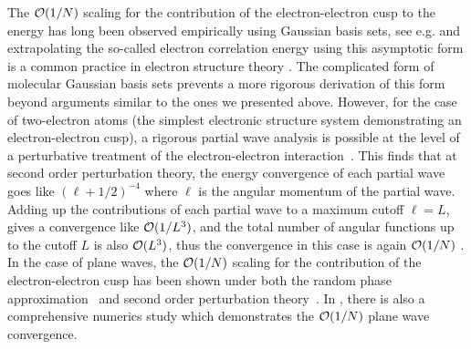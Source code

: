 \documentclass[superscriptaddress,aps,pra,nofootinbib,notitlepage,10pt,longbibliography]{revtex4-1}
\begin{document}
The ${\cal O}(1/N)$ scaling for the contribution of the electron-electron cusp to the energy has long been observed empirically using Gaussian basis sets, see e.g. \cite{helgaker1997basis,klopper1995ab,Halkier1998} and extrapolating the so-called electron correlation energy using this asymptotic form is a common practice in electron structure theory \cite{Helgaker2002}. The complicated form of molecular Gaussian basis sets prevents a more rigorous derivation of this form beyond arguments similar to the ones we presented above. However, for the case of two-electron atoms (the simplest electronic structure system demonstrating an electron-electron cusp), a rigorous partial wave analysis is possible at the level of a perturbative treatment of the electron-electron interaction~\cite{kutzelnigg1992rates}. This finds that at second order perturbation theory, the energy convergence of each partial wave goes like $(\ell+1/2)^{-4}$ where $\ell$ is the angular momentum of the partial wave. Adding up the contributions of each partial wave to a maximum cutoff $\ell=L$, gives a convergence like ${\cal O}(1/L^3)$, and the total number of angular functions up to the cutoff $L$ is also ${\cal O}(L^3)$, thus the convergence in this case is again ${\cal O}(1/N)$ \cite{kutzelnigg1992rates}. In the case of plane waves, the ${\cal O}(1/N)$ scaling for the contribution of the electron-electron cusp has been shown under both the random phase approximation~\cite{Harl2008} and second order perturbation theory~\cite{shepherd2012convergence}. In \cite{shepherd2012convergence}, there is also a comprehensive numerics study which demonstrates the ${\cal O}(1/N)$ plane wave convergence.
\end{document}
